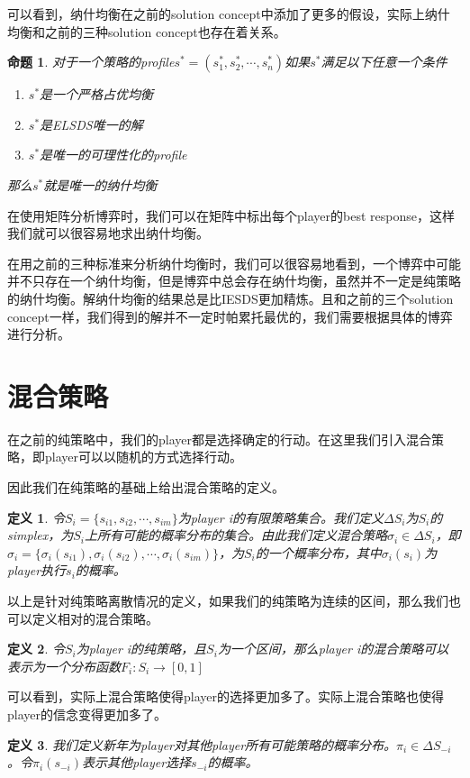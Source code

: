\documentclass[UTF8,12pt]{ctexart}
\newtheorem{Def}{定义}[section]
\newtheorem{Prop}{命题}[section]
\numberwithin{equation}{section} %
\numberwithin{figure}{section}
\numberwithin{table}{section}
\begin{document}
	可以看到，纳什均衡在之前的solution concept中添加了更多的假设，实际上纳什均衡和之前的三种solution concept也存在着关系。
	\begin{Prop}
		对于一个策略的profile$s^* = (s^*_1,s^*_2,\cdots,s^*_n)$如果$s^*$满足以下任意一个条件
		\begin{enumerate}
			\item $s^*$是一个严格占优均衡
			
			\item $s^*$是ELSDS唯一的解
			
			\item $s^*$是唯一的可理性化的profile
		\end{enumerate}
		那么$s^*$就是唯一的纳什均衡
	\end{Prop}
	
	在使用矩阵分析博弈时，我们可以在矩阵中标出每个player的best response，这样我们就可以很容易地求出纳什均衡。
	
	在用之前的三种标准来分析纳什均衡时，我们可以很容易地看到，一个博弈中可能并不只存在一个纳什均衡，但是博弈中总会存在纳什均衡，虽然并不一定是纯策略的纳什均衡。解纳什均衡的结果总是比IESDS更加精炼。且和之前的三个solution concept一样，我们得到的解并不一定时帕累托最优的，我们需要根据具体的博弈进行分析。
	
	
	\section{混合策略}
	在之前的纯策略中，我们的player都是选择确定的行动。在这里我们引入混合策略，即player可以以随机的方式选择行动。
	
	因此我们在纯策略的基础上给出混合策略的定义。
	\begin{Def}
		令$S_i = \{s_{i1},s_{i2},\cdots,s_{im}\}$为player i的有限策略集合。我们定义$\Delta S_i$为$S_i$的simplex，为$S_i$上所有可能的概率分布的集合。由此我们定义混合策略$\sigma_i \in \Delta S_i$，即$\sigma_i = \{\sigma_i(s_{i1}),\sigma_i(s_{i2}),\cdots,\sigma_i(s_{im})\}$，为$S_i$的一个概率分布，其中$\sigma_i(s_i)$为player执行$s_i$的概率。
	\end{Def}
	以上是针对纯策略离散情况的定义，如果我们的纯策略为连续的区间，那么我们也可以定义相对的混合策略。
	\begin{Def}
		令$S_i$为player i的纯策略，且$S_i$为一个区间，那么player i的混合策略可以表示为一个分布函数$F_i:S_i	\rightarrow [0,1]$
	\end{Def}
	
	可以看到，实际上混合策略使得player的选择更加多了。实际上混合策略也使得player的信念变得更加多了。
	\begin{Def}
		我们定义新年为player对其他player所有可能策略的概率分布。$\pi_i \in \Delta S_{-i}$。令$\pi_i(s_{-i})$表示其他player选择$s_{-i}$的概率。
	\end{Def}
	
\end{document}
